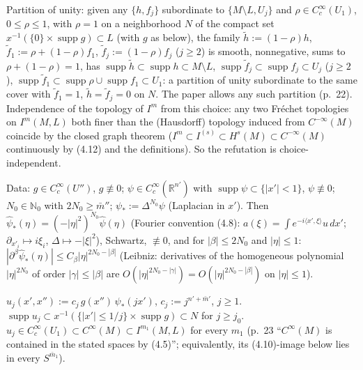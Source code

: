 \documentclass[11pt]{article}
\newcommand{\R}{\mathbb{R}}
\newcommand{\N}{\mathbb{N}}
\newcommand{\supp}{\operatorname{supp}}
\begin{document}
Partition of unity: given any $\{h,f_j\}$ subordinate to $\{M\setminus L,U_j\}$ and $\rho\in C_c^\infty(U_1)$, $0\le\rho\le1$, with $\rho=1$ on a neighborhood $N$ of the compact set $x^{-1}(\{0\}\times\supp g)\subset L$ (with $g$ as below), the family $\tilde h:=(1-\rho)h$, $\tilde f_1:=\rho+(1-\rho)f_1$, $\tilde f_j:=(1-\rho)f_j$ ($j\ge2$) is smooth, nonnegative, sums to $\rho+(1-\rho)=1$, has $\supp\tilde h\subset\supp h\subset M\setminus L$, $\supp\tilde f_j\subset\supp f_j\subset U_j$ ($j\ge2$), $\supp\tilde f_1\subset\supp\rho\cup\supp f_1\subset U_1$: a partition of unity subordinate to the same cover with $\tilde f_1=1$, $\tilde h=\tilde f_j=0$ on $N$. The paper allows any such partition (p.~22). Independence of the topology of $I^m$ from this choice: any two Fr\'echet topologies on $I^m(M,L)$ both finer than the (Hausdorff) topology induced from $C^{-\infty}(M)$ coincide by the closed graph theorem ($I^m\subset I^{(s)}\subset H^s(M)\subset C^{-\infty}(M)$ continuously by (4.12) and the definitions). So the refutation is choice-independent.

Data: $g\in C_c^\infty(U'')$, $g\not\equiv0$; $\psi\in C_c^\infty(\R^{n'})$ with $\supp\psi\subset\{|x'|<1\}$, $\psi\not\equiv0$; $N_0\in\N_0$ with $2N_0\ge\bar m''$; $\psi_*:=\Delta^{N_0}\psi$ (Laplacian in $x'$). Then $\hat\psi_*(\eta)=(-|\eta|^2)^{N_0}\hat\psi(\eta)$ (Fourier convention (4.8): $a(\xi)=\int e^{-i\langle x',\xi\rangle}u\,dx'$; $\partial_{x'_i}\mapsto i\xi_i$, $\Delta\mapsto-|\xi|^2$), Schwartz, $\not\equiv0$, and for $|\beta|\le2N_0$ and $|\eta|\le1$: $|\partial^\beta\hat\psi_*(\eta)|\le C_\beta|\eta|^{2N_0-|\beta|}$ (Leibniz: derivatives of the homogeneous polynomial $|\eta|^{2N_0}$ of order $|\gamma|\le|\beta|$ are $O(|\eta|^{2N_0-|\gamma|})=O(|\eta|^{2N_0-|\beta|})$ on $|\eta|\le1$).

$u_j(x',x''):=c_j\,g(x'')\,\psi_*(jx')$, $c_j:=j^{n'+\bar m'}$, $j\ge1$. $\supp u_j\subset x^{-1}(\{|x'|\le1/j\}\times\supp g)\subset N$ for $j\ge j_0$. $u_j\in C_c^\infty(U_1)\subset C^\infty(M)\subset I^{m_1}(M,L)$ for every $m_1$ (p.~23 ``$C^\infty(M)$ is contained in the stated spaces by (4.5)''; equivalently, its (4.10)-image below lies in every $S^{\bar m_1}$).
\end{document}
